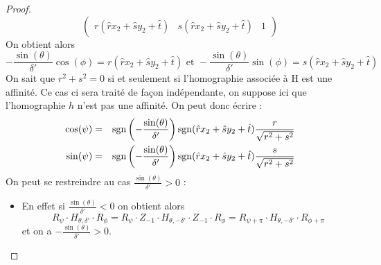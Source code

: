 \begin{proof}
\begin{equation*}
\begin{pmatrix}
  r(\hat r x_2 + \hat s y_2 +\hat t) & s(\hat r x_2 + \hat s y_2 +\hat t) &1
  \end{pmatrix} 
\end{equation*}
On obtient alors 
 \begin{equation*}
 -\frac{\sin(\theta)}{\delta'}\cos(\phi)=r(\hat r x_2 + \hat s y_2 +\hat t)\text{ et } -\frac{\sin(\theta)}{\delta'}\sin(\phi)=s(\hat r x_2 + \hat s y_2 +\hat t)
 \end{equation*}
 On sait que $r^{2}+s^{2}=0$ si et seulement si l'homographie associée à H est une affinité. Ce cas ci sera traité de façon indépendante, on suppose ici que l'homographie $h$ n'est pas une affinité. On peut donc écrire :
 \begin{eqnarray*}
 \cos(\psi) &=& \operatorname{sgn}\left(-\frac{\sin(\theta)}{ \delta'}\right)\operatorname{sgn}(\hat r x_2 + \hat s y_2 +\hat t)\frac{r}{\sqrt{r^{2}+s^{2}}}\\
 \sin(\psi) &=& \operatorname{sgn}\left(-\frac{\sin(\theta)}{ \delta'}\right)\operatorname{sgn}(\hat r x_2 + \hat s y_2 +\hat t)\frac{s}{\sqrt{r^{2}+s^{2}}}
 \end{eqnarray*}
 On peut se restreindre au cas $\frac{\sin(\theta)}{\delta'}>0$ :\\
 \begin{itemize}
 \item En effet si $\frac{\sin(\theta)}{\delta'}<0$ on obtient alors
 \begin{equation*}
 R_{\psi} \cdot H_{\theta,\delta'} \cdot R_{\phi}=R_{\psi} \cdot Z_{-1}\cdot H_{\theta,-\delta'}\cdot Z_{-1} \cdot R_{\phi}= R_{\psi+\pi} \cdot H_{\theta,-\delta'}\cdot R_{\phi+\pi}
 \end{equation*}
 et on a $-\frac{\sin(\theta)}{\delta'}>0$.\\
 \end{itemize}



\end{proof}
